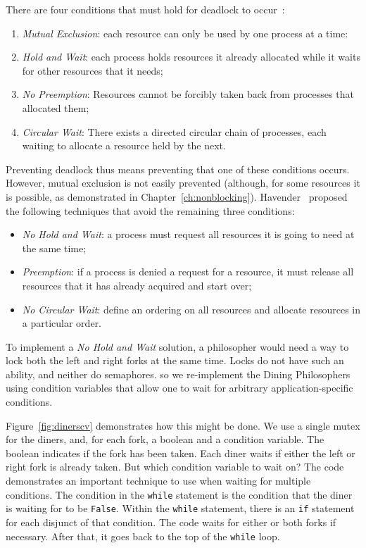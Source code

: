 \documentclass{report}
\begin{document}
\noindent
There are four conditions that must hold for deadlock to occur~\cite{CES71}:
\begin{enumerate}
\item \emph{Mutual Exclusion}: each resource can only be used by one process at a time:
\item \emph{Hold and Wait}: each process holds resources it already allocated while it
waits for other resources that it needs;
\item \emph{No Preemption}: Resources cannot be forcibly taken back from processes that
allocated them;
\item \emph{Circular Wait}: There exists a directed circular chain of processes, each waiting
to allocate a resource held by the next.
\end{enumerate}

Preventing deadlock thus means preventing that one of these conditions occurs.
However, mutual exclusion is not easily prevented (although, for some resources it is
possible, as demonstrated in Chapter~\ref{ch:nonblocking}).
Havender~\cite{Havender68} proposed the following techniques that avoid the remaining
three conditions:

\begin{itemize}
\item \emph{No Hold and Wait}: a process must request all resources it is going to
need at the same time;
\item \emph{Preemption}: if a process is denied a request for a resource, it must
release all resources that it has already acquired and start over;
\item \emph{No Circular Wait}: define an ordering on all resources and allocate
resources in a particular order.
\end{itemize}

To implement a \emph{No Hold and Wait} solution, a philosopher would need a
way to lock both the left and right forks at the same time.  Locks do not
have such an ability, and neither do semaphores. so we re-implement the
Dining Philosophers using condition variables that allow one to wait for
arbitrary application-specific conditions.

Figure~\ref{fig:dinerscv} demonstrates how this might be done.
We use a single mutex for the diners, and, for each fork, a boolean
and a condition variable.  The boolean indicates if the fork has been
taken.
Each diner waits if either the left or right fork is already taken.
But which condition variable to wait on?
The code demonstrates an important technique to use when waiting for
multiple conditions.
The condition in the \texttt{while} statement is the condition that the
diner is waiting for to be \texttt{False}.  Within the \texttt{while} statement,
there is an \texttt{if} statement for each disjunct of that condition.
The code waits for either or both forks if necessary.  After that, it goes
back to the top of the \texttt{while} loop.
\end{document}
